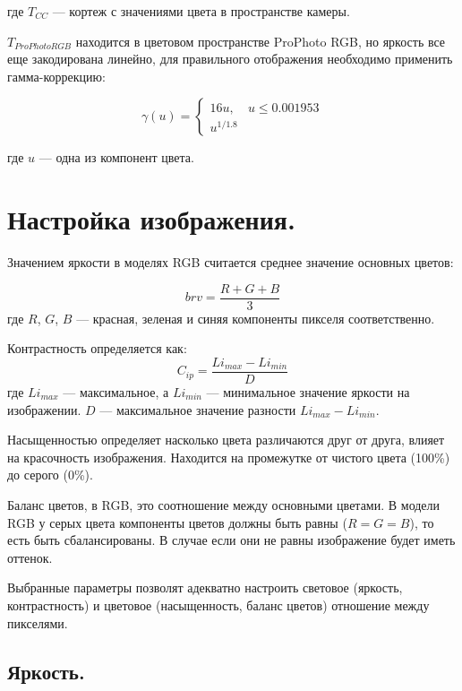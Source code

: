 где $T_{CC}$ --- кортеж с значениями цвета в пространстве камеры.

$T_{ProPhoto RGB}$ находится в цветовом пространстве ProPhoto RGB, но яркость все еще закодирована линейно, для правильного отображения необходимо применить гамма-коррекцию:

\begin{equation}
	\label{gamma}
	\gamma(u) = 
	\begin{cases}
		16u, & u \le 0.001953 \\
		u^{1/1.8}
	\end{cases}
\end{equation}

где $u$ --- одна из компонент цвета. \cite{ppspec}

\section{Настройка изображения.}

Значением яркости в моделях RGB считается среднее значение основных цветов:

\begin{equation}
	\label{br}
	brv = \frac{R + G + B}{3}
\end{equation}
где $R$, $G$, $B$ --- красная, зеленая и синяя компоненты пикселя соответственно. \cite{colorfaq}

Контрастность определяется как:
\begin{equation}
	\label{condef}
	C_{ip} = \frac{Li_{max} - Li_{min}}{D}
\end{equation}
где $Li_{max}$ --- максимальное, а $Li_{min}$ --- минимальное значение яркости на изображении. $D$ --- максимальное значение разности $Li_{max} - Li_{min}$. \cite{contrastdef}

Насыщенностью определяет насколько цвета различаются друг от друга, влияет на красочность изображения. Находится на промежутке от чистого цвета (100\%) до серого (0\%). \cite{satdef}

Баланс цветов, в RGB, это соотношение между основными цветами. В модели RGB у серых цвета компоненты цветов должны быть равны ($R = G = B$), то есть быть сбалансированы. В случае если они не равны изображение будет иметь оттенок. \cite{colorb}

Выбранные параметры позволят адекватно настроить световое (яркость, контрастность) и цветовое (насыщенность, баланс цветов) отношение между пикселями. 

\subsection{Яркость.}

